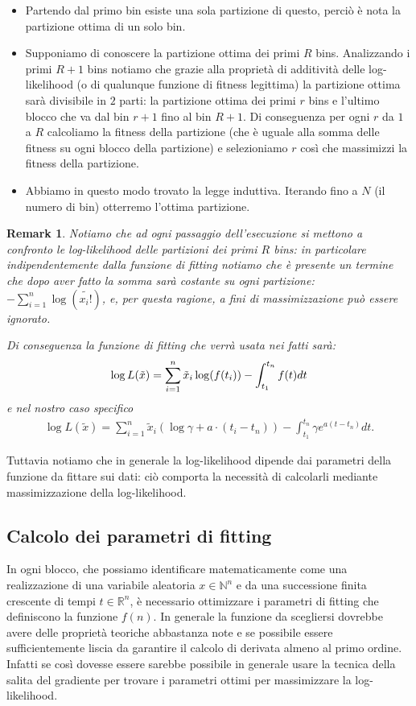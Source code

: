 \documentclass[10pt,a4paper]{report}
\newtheorem{remark}{Remark}
\begin{document}
\begin{itemize}
\item Partendo dal primo bin esiste una sola partizione di questo, perciò è nota la partizione ottima di un solo bin.
\item Supponiamo di conoscere la partizione ottima dei primi $R$ bins. Analizzando i primi $R+1$ bins notiamo che grazie alla proprietà di additività delle log-likelihood (o di qualunque funzione di fitness legittima) la partizione ottima sarà divisibile in $2$ parti: la partizione ottima dei primi $r$ bins e l'ultimo blocco che va dal bin $r+1$ fino al bin $R+1$. Di conseguenza per ogni $r$ da $1$ a $R$ calcoliamo la fitness della partizione (che è uguale alla somma delle fitness su ogni blocco della partizione) e selezioniamo $r$ così che massimizzi la fitness della partizione.
\item Abbiamo in questo modo trovato la legge induttiva. Iterando fino a $N$ (il numero di bin) otterremo l'ottima partizione.
\end{itemize}
\begin{remark}
Notiamo che ad ogni passaggio dell'esecuzione si mettono a confronto le log-likelihood delle partizioni dei primi $R$ bins: in particolare indipendentemente dalla funzione di fitting notiamo che è presente un termine che dopo aver fatto la somma sarà costante su ogni partizione: $-\sum_{i=1}^n \log(\tilde{x_i!})$, e, per questa ragione, a fini di massimizzazione può essere ignorato.

Di conseguenza la funzione di fitting che verrà usata nei fatti sarà:
\begin{equation*}
\log L(\tilde{x}) = \sum_{i=1}^n\tilde{x}_i\log(f(t_i)) -\int_{t_1}^{t_n}f(t) dt \\
\end{equation*}
e nel nostro caso specifico
\begin{gather}
\log L(\tilde{x}) = \sum_{i=1}^n\tilde{x}_i(\log\gamma + a\cdot(t_i-t_n)) -\int_{t_1}^{t_n}\gamma e^{a(t-t_n)} dt.\label{fitness_exp}
\end{gather}
\end{remark}
Tuttavia notiamo che in generale la log-likelihood dipende dai parametri della funzione da fittare sui dati: ciò comporta la necessità di calcolarli mediante massimizzazione della log-likelihood.
\subsection{Calcolo dei parametri di fitting}
In ogni blocco, che possiamo identificare matematicamente come una realizzazione di una variabile aleatoria $x\in\mathbb{N}^n$ e da una successione finita crescente di tempi $t\in\mathbb{R}^n$, è necessario ottimizzare i parametri di fitting che definiscono la funzione $f(n)$. In generale la funzione da scegliersi dovrebbe avere delle proprietà teoriche abbastanza note e se possibile essere sufficientemente liscia da garantire il calcolo di derivata almeno al primo ordine. Infatti se così dovesse essere sarebbe possibile in generale usare la tecnica della salita del gradiente per trovare i parametri ottimi per massimizzare la log-likelihood.
\end{document}
